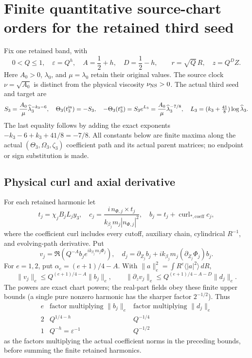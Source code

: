 \section{Finite quantitative source-chart orders for the retained third seed}
\label{qext:setup}
Fix one retained band, with
\[
0<Q\le1,\quad\varepsilon=Q^h,\quad A=\frac12+h,\quad D=\frac12-h,
\qquad r=\sqrt Q\,R,\quad z=Q^D Z .
\]
Here \(A_0>0\), \(\lambda _0\), and \(\mu=\lambda _0\) retain their original
values.  The source clock \(\nu=\sqrt{A_0}\) is distinct from the physical
viscosity \(\nu_{\rm NS}>0\).  The actual third seed and target are
\[
S_3=\frac{A_0}{\mu}\widehat\lambda _3^{-k_3-6},\quad
\Theta_3(t_3^{\rm in})=-S_3,\quad
-\Theta_3(t_3^a)=S_3e^{L_3}
=\frac{A_0}{\mu}\widehat\lambda _3^{-7/8},\quad
L_3=(k_3+\tfrac{41}{8})\log\widehat\lambda _3 .
\]
The last equality follows by adding the exact exponents
\(-k_3-6+k_3+41/8=-7/8\).  All constants below are finite maxima along
the actual \((\Theta_3,\Omega_3,\zeta_3)\) coefficient path and its actual
parent matrices; no endpoint or sign substitution is made.

\subsection{Physical curl and axial derivative}
For each retained harmonic let
\[
t_j=\chi_jB_jL_jy_3,\quad
c_j=\frac{i\,n_{\Phi,j}\times t_j}{k_{\beta_j}m_j|n_{\Phi,j}|^2},\quad
b_j=t_j+\operatorname{curl}_{*,\mathrm{coeff}}c_j,
\]
where the coefficient curl includes every cutoff, auxiliary chain,
cylindrical \(R^{-1}\), and evolving-path derivative.  Put
\[
v_j=\Re(Q^{-A}b_je^{ik_{\beta_j}m_j\Phi_j}),\quad
d_j=\partial_{Z_j}b_j+ik_{\beta_j}m_j(\partial_{Z_j}\Phi_j)b_j .
\]
For \(e=1,2\), put \(\alpha_e=(e+1)/4-A\). With \(\|a\|_e^2=\int R^e\langle|a|^2\rangle\,dR\),
\[
\|v_j\|_e\le Q^{(e+1)/4-A}\|b_j\|_e,\qquad
\|\partial_zv_j\|_e\le Q^{(e+1)/4-A-D}\|d_j\|_e .
\]
The powers are exact chart powers; the real-part fields obey these finite
upper bounds (a single pure nonzero harmonic has the sharper factor
\(2^{-1/2}\)).  Thus
\[
\begin{array}{c|cc}
e&\text{factor multiplying }\|b_j\|_e&\text{factor multiplying }\|d_j\|_e\\ \hline
2&Q^{1/4-h}&Q^{-1/4}\\
1&Q^{-h}=\varepsilon^{-1}&Q^{-1/2}
\end{array}
\]
as the factors multiplying the actual coefficient norms in the preceding bounds, before summing the finite retained harmonics.

